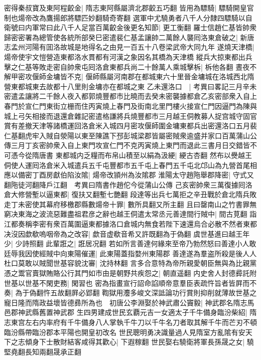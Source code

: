 密得秦叔寶及東阿程齩金|{
	隋志東阿縣屬濟北郡齩五巧翻}
皆用為驃騎|{
	驃騎開皇官制也煬帝改為鷹揚郎將驃匹妙翻騎奇寄翻}
選軍中尤驍勇者八千人分隸四驃騎以自衛號曰内軍常曰此八千人足當百萬齩金後更名知節|{
	更工衡翻}
羅士信趙仁基皆帥衆歸密密署為總管使各統所部癸巳密遣裴仁基孟讓帥二萬餘人襲囘洛東倉破之|{
	新唐志孟州河陽有囬洛故城是地得名之由見一百五十八卷梁武帝大同九年}
遂燒天津橋|{
	煬帝使宇文愷營造東都洛水貫都有河漢之象因名其橋為天津橋}
縱兵大掠東都出兵擊之仁基等敗走密自帥衆屯囘洛倉東都兵尚二十餘萬人乘城擊柝|{
	柝他各翻}
晝夜不解甲密攻偃師金墉皆不克|{
	偃師縣屬河南郡在都城東六十里晉金墉城在洛城西北隋營東都城東去故都十八里則金墉亦在都城之東}
乙未還洛口　|{
	考異曰畧記三月辛未密遣孟讓將二千餘人夜入都郭燒豐都市比曉而去癸未密襲據都倉乙亥密部衆入自上春門於宣仁門東街立栅而住丙寅燒上春門及街南北里門樓火接宣仁門因逼門為陳與城上弓矢相接而退還倉雜記密遣格謙將兵燒豐都市三月越王侗教募人捉宫城守固官賞有差撤天津等諸橋運回洛倉米入城四月密攻偃師圍金墉東都兵出密還洛口五月裴仁基翻虎牢入賊自滎陽以東至陳譙下邳彭城梁郡皆屬密賊衆逾盛并家口百萬蒲山公傳三月丁亥密帥衆入自上東門攻宣仁門不克丙寅燒上東門而退此三書月日交錯皆不可憑今從隋唐書}
東都城内乏糧而布帛山積至以絹為汲綆|{
	綆古杏翻}
然布以㸑越王侗使人運囘洛倉米入城遣兵五千屯豐都市五千屯上春門五千屯北邙山為九營首尾相應以備密丁酉房獻伯陷汝隂|{
	煬帝改頴州為汝隂郡}
淮陽太守趙陁舉郡降密|{
	守式又翻陁徒河翻降戶江翻　考異曰隋書作趙佗今從蒲山公傳}
己亥密帥衆三萬復據囘洛倉大修營塹以逼東都|{
	復扶又翻塹七艷翻}
段達等出兵七萬拒之辛丑戰於倉北隋兵敗走丁未密使其幕府移檄郡縣數煬帝十罪|{
	數所具翻又所主翻}
且曰罄南山之竹書罪無窮决東海之波流惡難盡祖君彦之辭也越王侗遣太常丞元善達間行賊中|{
	間古莧翻}
詣江都奏稱李密有衆百萬圍逼東都據洛口倉城内無食若陛下速還烏合必散不然者東都决沒因歔欷嗚咽帝為之改容|{
	歔音虚欷音希又許既翻為于偽翻}
虞世基進曰越王年少|{
	少詩照翻}
此輩誑之|{
	誑居况翻}
若如所言善達何緣來至帝乃勃然怒曰善達小人敢廷辱我因使經賊中向東陽催運|{
	此東陽蓋指婺州東陽郡}
善達遂為羣盗所殺是後人人杜口莫敢以賊聞世基容貌沈審|{
	沈持林翻}
言多合意特為帝所親愛朝臣無與為比親黨憑之鬻官賣獄賄賂公行其門如市由是朝野共疾怨之|{
	朝直遥翻}
内史舍人封德彛託附世基以世基不閑吏務|{
	閑習也}
密為指畫宣行詔命諂順帝意羣臣表疏忤旨者皆屛而不奏|{
	為于偽翻忤五故翻屛必郢翻}
鞫獄用灋多峻文深詆論功行賞則抑削就薄故世基之寵日隆而隋政益壞皆德彞所為也　初唐公李淵娶於神武肅公竇毅|{
	神武郡名隋志馬邑郡神武縣舊置神武郡}
生四男建成世民玄覇元吉一女適太子千牛備身臨汾柴紹|{
	隋志東宫左右内率府有千牛備身八人掌執千牛刀以千牛名刀者取其解千牛而芒刃不頓臨汾縣帶臨汾郡本平陽也開皇初改名}
世民聰明勇决識量過人見隋室方亂隂有安天下之志傾身下士散財結客咸得其歡心|{
	下遐稼翻}
世民娶右驍衛將軍長孫晟之女|{
	驍堅堯翻長知兩翻晟承正翻}
